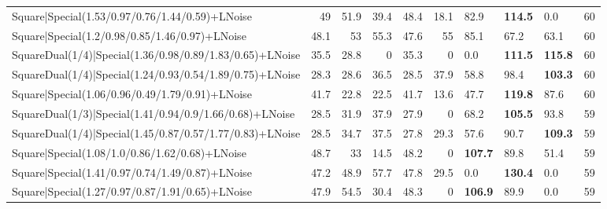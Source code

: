 \begin{tabular}{lrrrrrlllr}
 Square|Special(1.53/0.97/0.76/1.44/0.59)+LNoise                 &            49   &            51.9 &            39.4 &            48.4 &           18.1 & 82.9            & \textbf{114.5} & 0.0            &           60 \\
 Square|Special(1.2/0.98/0.85/1.46/0.97)+LNoise                  &            48.1 &            53   &            55.3 &            47.6 &           55   & 85.1            & 67.2           & 63.1           &           60 \\
 SquareDual(1/4)|Special(1.36/0.98/0.89/1.83/0.65)+LNoise        &            35.5 &            28.8 &             0   &            35.3 &            0   & 0.0             & \textbf{111.5} & \textbf{115.8} &           60 \\
 SquareDual(1/4)|Special(1.24/0.93/0.54/1.89/0.75)+LNoise        &            28.3 &            28.6 &            36.5 &            28.5 &           37.9 & 58.8            & 98.4           & \textbf{103.3} &           60 \\
 Square|Special(1.06/0.96/0.49/1.79/0.91)+LNoise                 &            41.7 &            22.8 &            22.5 &            41.7 &           13.6 & 47.7            & \textbf{119.8} & 87.6           &           60 \\
 SquareDual(1/3)|Special(1.41/0.94/0.9/1.66/0.68)+LNoise         &            28.5 &            31.9 &            37.9 &            27.9 &            0   & 68.2            & \textbf{105.5} & 93.8           &           59 \\
 SquareDual(1/4)|Special(1.45/0.87/0.57/1.77/0.83)+LNoise        &            28.5 &            34.7 &            37.5 &            27.8 &           29.3 & 57.6            & 90.7           & \textbf{109.3} &           59 \\
 Square|Special(1.08/1.0/0.86/1.62/0.68)+LNoise                  &            48.7 &            33   &            14.5 &            48.2 &            0   & \textbf{107.7}  & 89.8           & 51.4           &           59 \\
 Square|Special(1.41/0.97/0.74/1.49/0.87)+LNoise                 &            47.2 &            48.9 &            57.7 &            47.8 &           29.5 & 0.0             & \textbf{130.4} & 0.0            &           59 \\
 Square|Special(1.27/0.97/0.87/1.91/0.65)+LNoise                 &            47.9 &            54.5 &            30.4 &            48.3 &            0   & \textbf{106.9}  & 89.9           & 0.0            &           59 \\

\end{tabular}
